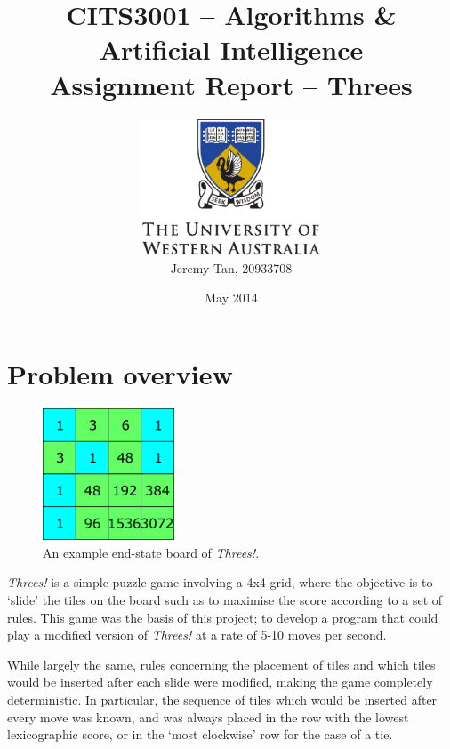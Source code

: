 \documentclass[a4paper, 11pt, titlepage]{report}
\newcommand{\threes}{\emph{Threes!}}
\begin{document}
\begin{titlepage}
	\title{\crimsonfont CITS3001 -- Algorithms \& Artificial Intelligence\\Assignment Report -- Threes}
	\author{\includegraphics[width=150pt]{figures/uwacrest.pdf}\\[2em]
		Jeremy Tan, 20933708 }
	\date{May 2014}
	\maketitle
	\centering
\end{titlepage}


\chapter{Problem overview}
\begin{figure}[H]
	\centering
	\includegraphics[width=0.35\textwidth]{figures/endboard.pdf}
	\caption{An example end-state board of \threes{}.}
\end{figure}

\threes{}\cite{threes} is a simple puzzle game involving a 4x4 grid, where the objective is to `slide' the tiles on the board such as to maximise the score according to a set of rules. This game was the basis of this project; to develop a program that could play a modified version of \threes{} at a rate of 5-10 moves per second.

While largely the same, rules concerning the placement of tiles and which tiles would be inserted after each slide were modified, making the game completely deterministic. In particular, the sequence of tiles which would be inserted after every move was known, and was always placed in the row with the lowest lexicographic score, or in the `most clockwise' row for the case of a tie.
\end{document}
